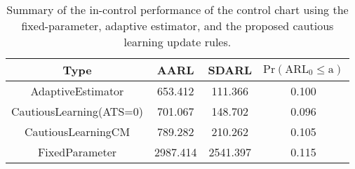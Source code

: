 \begin{table}[!h]

\caption{Summary of the in-control performance of the control chart using the fixed-parameter, adaptive estimator, and the proposed cautious learning update rules.}
\centering
\begin{tabular}[t]{cccc}
\toprule
Type & AARL & SDARL & $\text{Pr}(\text{ARL}_0 \leq \text{a})$\\
\midrule
AdaptiveEstimator & 653.412 & 111.366 & 0.100\\
CautiousLearning(ATS=0) & 701.067 & 148.702 & 0.096\\
CautiousLearningCM & 789.282 & 210.262 & 0.105\\
FixedParameter & 2987.414 & 2541.397 & 0.115\\
\bottomrule
\end{tabular}
\end{table}
